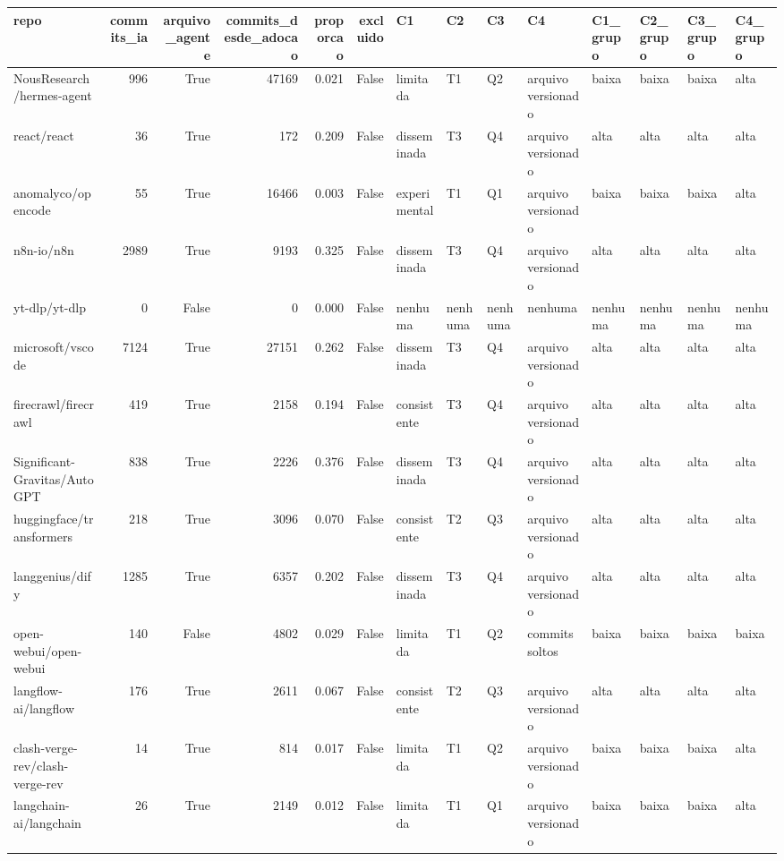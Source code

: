 \begin{tabular}{lrrrrrllllllll}
\toprule
repo & commits_ia & arquivo_agente & commits_desde_adocao & proporcao & excluido & C1 & C2 & C3 & C4 & C1_grupo & C2_grupo & C3_grupo & C4_grupo \\
\midrule
NousResearch/hermes-agent & 996 & True & 47169 & 0.021 & False & limitada & T1 & Q2 & arquivo versionado & baixa & baixa & baixa & alta \\
react/react & 36 & True & 172 & 0.209 & False & disseminada & T3 & Q4 & arquivo versionado & alta & alta & alta & alta \\
anomalyco/opencode & 55 & True & 16466 & 0.003 & False & experimental & T1 & Q1 & arquivo versionado & baixa & baixa & baixa & alta \\
n8n-io/n8n & 2989 & True & 9193 & 0.325 & False & disseminada & T3 & Q4 & arquivo versionado & alta & alta & alta & alta \\
yt-dlp/yt-dlp & 0 & False & 0 & 0.000 & False & nenhuma & nenhuma & nenhuma & nenhuma & nenhuma & nenhuma & nenhuma & nenhuma \\
microsoft/vscode & 7124 & True & 27151 & 0.262 & False & disseminada & T3 & Q4 & arquivo versionado & alta & alta & alta & alta \\
firecrawl/firecrawl & 419 & True & 2158 & 0.194 & False & consistente & T3 & Q4 & arquivo versionado & alta & alta & alta & alta \\
Significant-Gravitas/AutoGPT & 838 & True & 2226 & 0.376 & False & disseminada & T3 & Q4 & arquivo versionado & alta & alta & alta & alta \\
huggingface/transformers & 218 & True & 3096 & 0.070 & False & consistente & T2 & Q3 & arquivo versionado & alta & alta & alta & alta \\
langgenius/dify & 1285 & True & 6357 & 0.202 & False & disseminada & T3 & Q4 & arquivo versionado & alta & alta & alta & alta \\
open-webui/open-webui & 140 & False & 4802 & 0.029 & False & limitada & T1 & Q2 & commits soltos & baixa & baixa & baixa & baixa \\
langflow-ai/langflow & 176 & True & 2611 & 0.067 & False & consistente & T2 & Q3 & arquivo versionado & alta & alta & alta & alta \\
clash-verge-rev/clash-verge-rev & 14 & True & 814 & 0.017 & False & limitada & T1 & Q2 & arquivo versionado & baixa & baixa & baixa & alta \\
langchain-ai/langchain & 26 & True & 2149 & 0.012 & False & limitada & T1 & Q1 & arquivo versionado & baixa & baixa & baixa & alta \\

\end{tabular}
